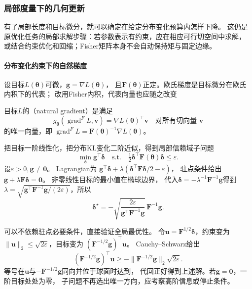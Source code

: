 \subsubsection{局部度量下的几何更新}
\label{sec:information-geometric-update}

有了局部长度和目标微分，就可以确定在给定分布变化预算内怎样下降。
这仍是原优化任务的局部求解步骤：若参数表示有约束，应在相应可行切空间中求解，
或结合约束优化和回缩；Fisher矩阵本身不会自动保持矩与固定边缘。

\paragraph{分布变化约束下的自然梯度}
\label{sec:information-natural-gradient-update}

设目标\(L(\bm\theta)\)可微，\(\bm g=\nabla L(\bm\theta)\)，
且\(\bm F(\bm\theta)\)正定。欧氏梯度是目标微分在欧氏内积下的代表；
改用Fisher内积，代表向量也应随之改变
\begin{definition}[自然梯度]
\label{def:information-natural-gradient}
目标\(L\)的（natural gradient）是满足
\[
  g_{\bm\theta}(\operatorname{grad}^{F}L,\bm v)
  =\nabla L(\bm\theta)^\top\bm v
  \quad\text{对所有切向量 }\bm v
\]
的唯一向量，即
\(\operatorname{grad}^{F}L=\bm F(\bm\theta)^{-1}\nabla L(\bm\theta)\)。
\end{definition}

把目标一阶线性化，把分布KL变化二阶近似，得到局部信赖域子问题
\begin{equation}
  \min_{\bm\delta}\bm g^\top\bm\delta
  \quad\text{s.t.}\quad
  \tfrac12\bm\delta^\top\bm F(\bm\theta)\bm\delta\leq\varepsilon.
  \label{eq:information-natural-gradient-trust-region}
\end{equation}
设\(\varepsilon>0,\bm g\neq\bm0\)。
Lagrangian为
\(\bm g^\top\bm\delta+\lambda(\bm\delta^\top\bm F\bm\delta/2-\varepsilon)\)，
驻点条件给出
\(\bm g+\lambda\bm F\bm\delta=\bm0\)。
非零线性目标的最小值在椭球边界，
代入\(\bm\delta=-\lambda^{-1}\bm F^{-1}\bm g\)得到
\(\lambda=\sqrt{\bm g^\top\bm F^{-1}\bm g/(2\varepsilon)}\)，所以
\begin{equation}
  \bm\delta^\star
  =-\sqrt{\frac{2\varepsilon}{\bm g^\top\bm F^{-1}\bm g}}\,
    \bm F^{-1}\bm g.
  \label{eq:information-natural-gradient-step}
\end{equation}

可以不依赖驻点必要条件，直接验证全局最优性。
令\(\bm u=\bm F^{1/2}\bm\delta\)，约束变为
\(\|\bm u\|_2\leq\sqrt{2\varepsilon}\)，目标变为
\((\bm F^{-1/2}\bm g)^\top\bm u\)。
Cauchy--Schwarz给出
\[
  (\bm F^{-1/2}\bm g)^\top\bm u
  \geq-\|\bm F^{-1/2}\bm g\|_2\sqrt{2\varepsilon}.
\]
等号在\(\bm u\)与\(-\bm F^{-1/2}\bm g\)同向并位于球面时达到，
代回正好得到上述解。若\(\bm g=\bm0\)，一阶目标处处为零，
子问题不再选出唯一方向，应考察高阶信息或停止条件。

